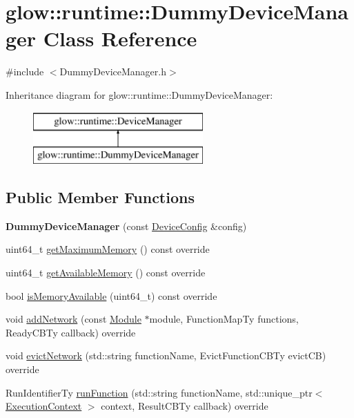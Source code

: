 \hypertarget{classglow_1_1runtime_1_1_dummy_device_manager}{}\section{glow\+:\+:runtime\+:\+:Dummy\+Device\+Manager Class Reference}
\label{classglow_1_1runtime_1_1_dummy_device_manager}


{\ttfamily \#include $<$Dummy\+Device\+Manager.\+h$>$}

Inheritance diagram for glow\+:\+:runtime\+:\+:Dummy\+Device\+Manager\+:\begin{figure}[H]
\begin{center}
\leavevmode
\includegraphics[height=2.000000cm]{classglow_1_1runtime_1_1_dummy_device_manager}
\end{center}
\end{figure}
\subsection*{Public Member Functions}
\begin{DoxyCompactItemize}
\item 
\mbox{\label{classglow_1_1runtime_1_1_dummy_device_manager_a527bdf78603fddeb50b390e6d8636dd2}} 
{\bfseries Dummy\+Device\+Manager} (const \hyperlink{structglow_1_1runtime_1_1_device_config}{Device\+Config} \&config)
\item 
uint64\+\_\+t \hyperlink{classglow_1_1runtime_1_1_dummy_device_manager_a58bc8e9d658c8b173d27527a4251e5e0}{get\+Maximum\+Memory} () const override
\item 
uint64\+\_\+t \hyperlink{classglow_1_1runtime_1_1_dummy_device_manager_a96ef72c763a1932e1482c29b4eea486b}{get\+Available\+Memory} () const override
\item 
bool \hyperlink{classglow_1_1runtime_1_1_dummy_device_manager_a51b1549661977f06447122f0529d8b14}{is\+Memory\+Available} (uint64\+\_\+t) const override
\item 
void \hyperlink{classglow_1_1runtime_1_1_dummy_device_manager_a73a826505a055281b9ad2902f6ffdb0f}{add\+Network} (const \hyperlink{classglow_1_1_module}{Module} $\ast$module, Function\+Map\+Ty functions, Ready\+C\+B\+Ty callback) override
\item 
void \hyperlink{classglow_1_1runtime_1_1_dummy_device_manager_a69a52700a23ae64f2c9db09e1e32c038}{evict\+Network} (std\+::string function\+Name, Evict\+Function\+C\+B\+Ty evict\+CB) override
\item 
Run\+Identifier\+Ty \hyperlink{classglow_1_1runtime_1_1_dummy_device_manager_a6a0da3ce939dea1323eead33a27d5487}{run\+Function} (std\+::string function\+Name, std\+::unique\+\_\+ptr$<$ \hyperlink{classglow_1_1_execution_context}{Execution\+Context} $>$ context, Result\+C\+B\+Ty callback) override
\end{DoxyCompactItemize}
